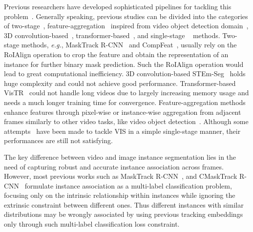 \documentclass[runningheads]{llncs}
\begin{document}
Previous researchers have developed sophisticated pipelines for tackling this problem~\cite{yang2018efficient,voigtlaender2019feelvos,yang2019video,cao2020sipmask,bertasius2020classifying,wang2021end,athar2020stem,fu2020compfeat}. 
Generally speaking, previous studies can be divided into the categories of two-stage~\cite{yang2018efficient,voigtlaender2019feelvos,yang2019video,bertasius2020classifying,fu2020compfeat}, feature-aggregation~\cite{liu2021sg,bertasius2020classifying} inspired from video object detection domain~\cite{zhu2017flow,jiang2020learning,jiang2019video}, 3D convolution-based~\cite{athar2020stem}, transformer-based~\cite{wang2021end,hwang2021video}, and single-stage ~\cite{cao2020sipmask,yang2021crossover} methods. Two-stage methods, \emph{e.g.}, MaskTrack R-CNN~\cite{yang2019video} and CompFeat~\cite{fu2020compfeat}, usually rely on the RoIAlign operation to crop the feature and obtain the representation of an instance for further binary mask prediction. 
Such the RoIAlign operation would lead to great computational inefficiency. 3D convolution-based STEm-Seg~\cite{athar2020stem} holds huge complexity and could not achieve good performance. Transformer-based VisTR~\cite{wang2021end,hwang2021video} could not handle long videos due to largely increasing memory usage and needs a much longer training time for convergence. Feature-aggregation methods~\cite{li2021spatial,wangtao2021end} enhance features through pixel-wise or instance-wise aggregation from adjacent frames similarly to other video tasks, like video object detection~\cite{jiang2020learning,jiang2019video,wu2019sequence}. Although some attempts~\cite{cao2020sipmask,wu2021track,yang2021crossover} have been made to tackle VIS in a simple single-stage manner, their performances are still not satisfying.

The key difference between video and image instance segmentation lies in the need of capturing robust and accurate instance association across frames. However, most previous works such as MaskTrack R-CNN~\cite{yang2019video}, and CMaskTrack R-CNN~\cite{qi2021occluded} formulate instance association as a multi-label classification problem, focusing only on the intrinsic relationship within instances while ignoring the extrinsic constraint between different ones. Thus different instances with similar distributions may be wrongly associated by using previous tracking embeddings only through such multi-label classification loss constraint. 
\end{document}
